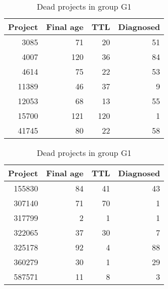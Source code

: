 \begin{table}[H]
\newcommand{\tableDeadsGOneHead}{\textbf{Project} & \textbf{Final age} &
\textbf{TTL} & \textbf{Diagnosed}}
\caption{Dead projects in group G1}\label{table:deads_g1}
\centering
\begin{tabular}{rrrr}
\hline
	\tableDeadsGOneHead\\
	\hline
	3085 & 71 & 20 & 51 \\
	4007 & 120 & 36 & 84 \\
	4614 & 75 & 22 & 53 \\
	11389 & 46 & 37 & 9 \\
	12053 & 68 & 13 & 55 \\
	15700 & 121 & 120 & 1 \\
	41745 & 80 & 22 & 58 \\
\hline
\end{tabular}
\hspace{1em}
\begin{tabular}{rrrr}
\hline
	\tableDeadsGOneHead\\
	\hline
	155830 & 84 & 41 & 43 \\
	307140 & 71 & 70 & 1 \\
	317799 & 2 & 1 & 1 \\
	322065 & 37 & 30 & 7 \\
	325178 & 92 & 4 & 88 \\
	360279 & 30 & 1 & 29 \\
	587571 & 11 & 8 & 3 \\
\hline
\end{tabular}
\end{table}